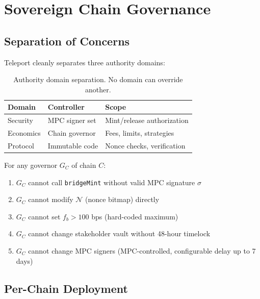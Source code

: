 \section{Sovereign Chain Governance}

\label{sec:governance}

\subsection{Separation of Concerns}

Teleport cleanly separates three authority domains:

\begin{table}[h]
\centering
\small
\begin{tabular}{lll}
\toprule
\textbf{Domain} & \textbf{Controller} & \textbf{Scope} \\
\midrule
Security & MPC signer set & Mint/release authorization \\
Economics & Chain governor & Fees, limits, strategies \\
Protocol & Immutable code & Nonce checks, verification \\
\bottomrule
\end{tabular}
\caption{Authority domain separation. No domain can override another.}
\label{tab:separation}
\end{table}

\begin{property}
\label{prop:isolation}
For any governor $G_C$ of chain $C$:
\begin{enumerate}[nosep]
  \item $G_C$ cannot call \texttt{bridgeMint} without valid MPC signature $\sigma$
  \item $G_C$ cannot modify $\mathcal{N}$ (nonce bitmap) directly
  \item $G_C$ cannot set $f_b > 100$ bps (hard-coded maximum)
  \item $G_C$ cannot change stakeholder vault without 48-hour timelock
  \item $G_C$ cannot change MPC signers (MPC-controlled, configurable delay up to 7 days)
\end{enumerate}
\end{property}

\subsection{Per-Chain Deployment}

